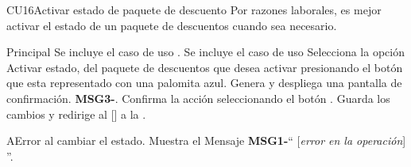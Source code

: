 \begin{UseCase}{CU16}{Activar estado de paquete de descuento}{
		Por razones laborales, es mejor activar el estado de un paquete de descuentos cuando sea necesario.
	}
	\end{UseCase}




	\begin{UCtrayectoria}{Principal}
		\UCpaso Se incluye el caso de uso .
		\UCpaso Se incluye el caso de uso  
		\UCpaso[\UCactor] Selecciona la opción Activar estado, del paquete de descuentos que desea activar presionando el botón que esta representado con una palomita azul.		
		\UCpaso Genera y despliega una pantalla de confirmación.  {\bf MSG3-}.
		\UCpaso[\UCactor] Confirma la acción seleccionando el botón . 
		\UCpaso Guarda los cambios y redirige al [\UCactor] a la  .
	\end{UCtrayectoria}




\begin{UCtrayectoriaA}{A}{Error al cambiar el estado.}
			\UCpaso Muestra el Mensaje {\bf MSG1-}`` [{\em error en la operación}] ''.
			
		\end{UCtrayectoriaA}

